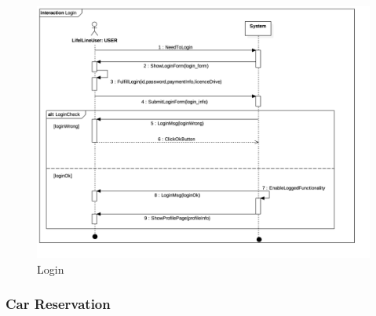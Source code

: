 \begin{center}
\begin{figure}[H]
\includegraphics[scale=0.2]{UML/png/Collaboration1__Interaction1__Login_2}

\caption{Login}

\end{figure}
\par\end{center}

\subsubsection{Car Reservation}

